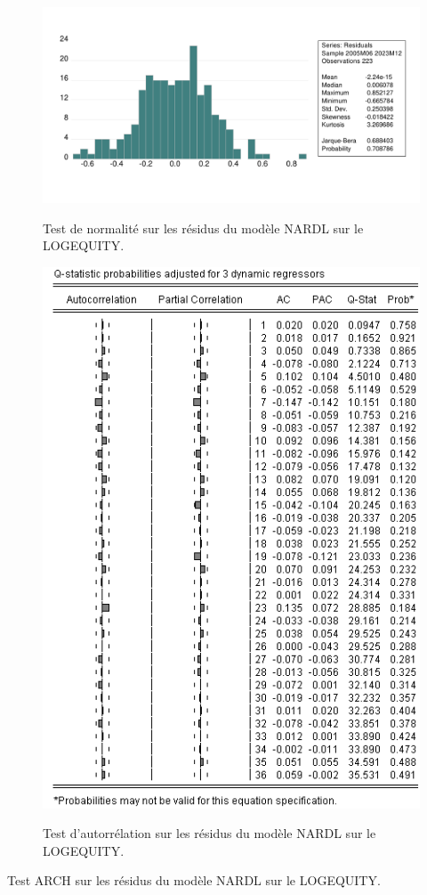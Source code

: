 \begin{figure}[H]
    \centering
    \caption{Test de normalité sur les résidus du modèle NARDL sur le LOGEQUITY.}
    \includegraphics[scale=0.8]{annexes/normalite_nardl_logequity.pdf}
    \label{fig:normalite_nardl_logequity}
\end{figure}

\begin{figure}[H]
    \centering
    \caption{Test d'autorrélation sur les résidus du modèle NARDL sur le LOGEQUITY.}
    \includegraphics[scale=0.8]{annexes/autorrelation_nardl_logequity.png}
    \label{fig:correlo_nardl_equity}
\end{figure}

\begin{table}[H]
    \centering
    \sffamily
    \caption{Test ARCH sur les résidus du modèle NARDL sur le LOGEQUITY.}
    \label{tab:arch_nardl_logequity}
    \resizebox{0.8\textwidth}{!}{}
\end{table}


\restoregeometry